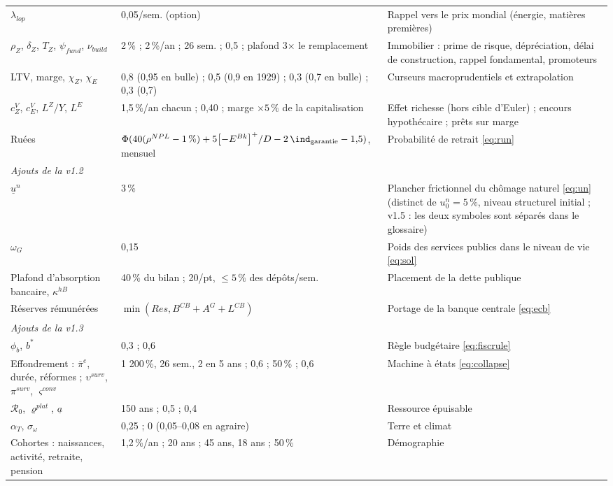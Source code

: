 \documentclass[11pt,a4paper]{article}
\newcommand{\pos}[1]{{\left[#1\right]^{+}}}
\begin{document}
\begin{center}
\begin{longtable}{p{4.2cm}p{3.0cm}p{7.6cm}}
$\lambda_{lop}$ & 0,05/sem. (option) & Rappel vers le prix mondial (énergie, matières premières)\\
$\rho_Z$, $\delta_Z$, $T_Z$, $\psi_{fund}$, $\nu_{build}$ & 2\,\% ; 2\,\%/an ; 26 sem. ; 0,5 ; plafond 3$\times$ le remplacement & Immobilier : prime de risque, dépréciation, délai de construction, rappel fondamental, promoteurs\\
LTV, marge, $\chi_Z$, $\chi_E$ & 0,8 (0,95 en bulle) ; 0,5 (0,9 en 1929) ; 0,3 (0,7 en bulle) ; 0,3 (0,7) & Curseurs macroprudentiels et extrapolation\\
$c^V_Z$, $c^V_E$, $L^Z/Y$, $L^E$ & 1,5\,\%/an chacun ; 0,40 ; marge $\times5\,\%$ de la capitalisation & Effet richesse (hors cible d'Euler) ; encours hypothécaire ; prêts sur marge\\
Ruées & $\Phi(40(\rho^{NPL}-1\,\%) + 5\pos{-E^{Bk}}/D - 2\,\ind_{\text{garantie}} - 1{,}5)$, mensuel & Probabilité de retrait \eqref{eq:run}\\
\midrule
\multicolumn{3}{l}{\emph{Ajouts de la v1.2}}\\
$\underline u^n$ & 3\,\% & Plancher frictionnel du chômage naturel \eqref{eq:un} (distinct de $u^n_0=5\,\%$, niveau structurel initial ; v1.5 : les deux symboles sont séparés dans le glossaire)\\
$\omega_G$ & 0,15 & Poids des services publics dans le niveau de vie \eqref{eq:sol}\\
Plafond d'absorption bancaire, $\kappa^{hB}$ & 40\,\% du bilan ; 20/pt, $\le5\,\%$ des dépôts/sem. & Placement de la dette publique\\
Réserves rémunérées & $\min(Res, B^{CB}+A^G+L^{CB})$ & Portage de la banque centrale \eqref{eq:ecb}\\
\midrule
\multicolumn{3}{l}{\emph{Ajouts de la v1.3}}\\
$\phi_b$, $b^\ast$ & 0,3 ; 0,6 & Règle budgétaire \eqref{eq:fiscrule}\\
Effondrement : $\bar\pi^e$, durée, réformes ; $\upsilon^{surv}$, $\pi^{surv}$, $\varsigma^{conv}$ & 1 200\,\%, 26 sem., 2 en 5 ans ; 0,6 ; 50\,\% ; 0,6 & Machine à états \eqref{eq:collapse}\\
$\mathcal R_0$, $\varrho^{plat}$, $\underline a$ & 150 ans ; 0,5 ; 0,4 & Ressource épuisable\\
$\alpha_T$, $\sigma_\omega$ & 0,25 ; 0 (0,05--0,08 en agraire) & Terre et climat\\
Cohortes : naissances, activité, retraite, pension & 1,2\,\%/an ; 20 ans ; 45 ans, 18 ans ; 50\,\% & Démographie\\

\end{longtable}
\end{center}
\end{document}
